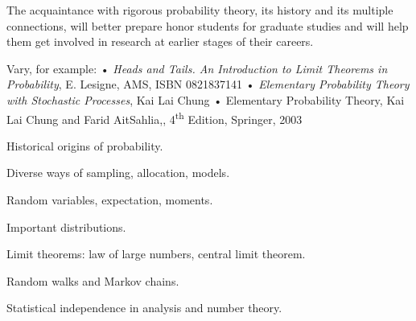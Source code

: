 \documentclass{osucourse}
\begin{document}
\CatalogDescription
\PrerequisitesAndExclusions

\begin{Purpose}
The acquaintance with rigorous probability theory, its history and its multiple connections, will better prepare honor students for graduate studies and will help them get involved in research at earlier stages of their careers.
\end{Purpose}

\begin{Text}
Vary, for example: • \emph{Heads and Tails. An Introduction to Limit Theorems in Probability}, E. Lesigne, AMS, ISBN 0821837141 • \emph{Elementary Probability Theory with Stochastic Processes}, Kai Lai Chung • Elementary Probability Theory, Kai Lai Chung and Farid AitSahlia,, 4\textsuperscript{th} Edition, Springer, 2003
\end{Text}

\begin{TopicsList}
\item Historical origins of probability.
\item Diverse ways of sampling, allocation, models.
\item Random variables, expectation, moments.
\item Important distributions.
\item Limit theorems: law of large numbers, central limit theorem.
\item Random walks and Markov chains.
\item Statistical independence in analysis and number theory.
\end{TopicsList}
\end{document}
